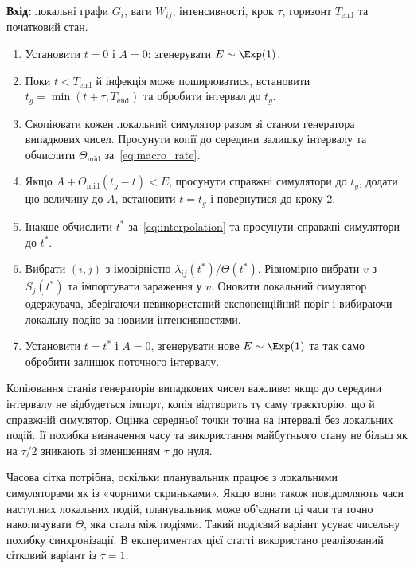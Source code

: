 \begin{algorithm}[tbp]
\color{black}
\caption{\textcolor{black}{Один запуск двомасштабного симулятора з узгодженням за часовою сіткою.}}
\label{alg:scheduler}
\small

\textbf{Вхід:} локальні графи $G_i$, ваги $W_{ij}$, інтенсивності, крок $\tau$, горизонт $T_{\mathrm{end}}$ та початковий стан.
\begin{enumerate}
\item Установити $t=0$ і $A=0$; згенерувати $E\sim\Exp(1)$.
\item Поки $t<T_{\mathrm{end}}$ й інфекція може поширюватися, встановити $t_g=\min(t+\tau,T_{\mathrm{end}})$ та обробити інтервал до $t_g$.
\item Скопіювати кожен локальний симулятор разом зі станом генератора випадкових чисел. Просунути копії до середини залишку інтервалу та обчислити $\Theta_{\mathrm{mid}}$ за~\eqref{eq:macro_rate}.
\item Якщо $A+\Theta_{\mathrm{mid}}(t_g-t)<E$, просунути справжні симулятори до $t_g$, додати цю величину до $A$, встановити $t=t_g$ і повернутися до кроку 2.
\item Інакше обчислити $t^\ast$ за~\eqref{eq:interpolation} та просунути справжні симулятори до $t^\ast$.
\item Вибрати $(i,j)$ з імовірністю $\lambda_{ij}(t^\ast)/\Theta(t^\ast)$. Рівномірно вибрати $v$ з $S_j(t^\ast)$ та імпортувати зараження у $v$. Оновити локальний симулятор одержувача, зберігаючи невикористаний експоненційний поріг і вибираючи локальну подію за новими інтенсивностями.
\item Установити $t=t^\ast$ і $A=0$, згенерувати нове $E\sim\Exp(1)$ та так само обробити залишок поточного інтервалу.
\end{enumerate}

\end{algorithm}

Копіювання станів генераторів випадкових чисел важливе: якщо до середини інтервалу не відбудеться імпорт, копія відтворить ту саму траєкторію, що й справжній симулятор. Оцінка середньої точки точна на інтервалі без локальних подій. Її похибка визначення часу та використання майбутнього стану не більш як на $\tau/2$ зникають зі зменшенням $\tau$ до нуля.

Часова сітка потрібна, оскільки планувальник працює з локальними симуляторами як із «чорними скриньками». Якщо вони також повідомляють часи наступних локальних подій, планувальник може об'єднати ці часи та точно накопичувати $\Theta$, яка стала між подіями. Такий подієвий варіант усуває чисельну похибку синхронізації. В експериментах цієї статті використано реалізований сітковий варіант із $\tau=1$.

